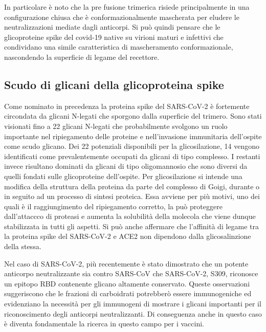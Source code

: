 In particolare è noto che la pre fusione trimerica risiede principalmente in una configurazione chiusa che è conformazionalmente mascherata per eludere le neutralizzazioni mediate dagli anticorpi. Si può quindi pensare che le glicoproteine spike del covid-19 native su virioni maturi e infettivi che condividano una simile caratteristica di mascheramento conformazionale, nascondendo la superficie di legame del recettore.

\subsection{Scudo di glicani della glicoproteina spike}\label{subsec:scudospike}
Come nominato in precedenza la proteina spike del SARS-CoV-2 è fortemente circondata da glicani N-legati che sporgono dalla superficie del trimero. Sono stati visionati fino a 22 glicani N-legati che probabilmente svolgono un ruolo importante nel ripiegamento delle proteine e nell'invasione immunitaria dell'ospite come scudo glicano. Dei 22 potenziali disponibili per la glicosilazione, 14 vengono identificati come prevalentemente occupati da glicani di tipo complesso. I restanti invece risultano dominati da glicani di tipo oligomannosio che sono diversi da quelli fondati sulle glicoproteine dell'ospite. Per glicosilazione si intende una modifica della struttura della proteina da parte del complesso di Goigi, durante o in seguito ad un processo di sintesi proteica. Essa avviene per più motivi, uno dei quali è il raggiungimento del ripiegamento corretto, la può proteggere dall'attaccco di proteasi e aumenta la solubilità della molecola che viene dunque stabilizzata in tutti gli aspetti. Si può anche affermare che l'affinità di legame tra la proteina spike del SARS-CoV-2 e ACE2 non dipendono dalla glicosalinzione della stessa.

Nel caso di SARS-CoV-2, più recentemente è stato dimostrato che un potente anticorpo neutralizzante sia contro SARS-CoV che SARS-CoV-2, S309, riconosce un epitopo RBD contenente glicano altamente conservato. Queste osservazioni suggeriscono che le frazioni di carboidrati potrebberò essere immunogeniche ed evidenziano la necessità per gli immunogeni di mostrare i glicani importanti per il riconoscimento degli anticorpi neutralizzanti. Di conseguenza anche in questo caso è diventa fondamentale la ricerca in questo campo per i vaccini.


